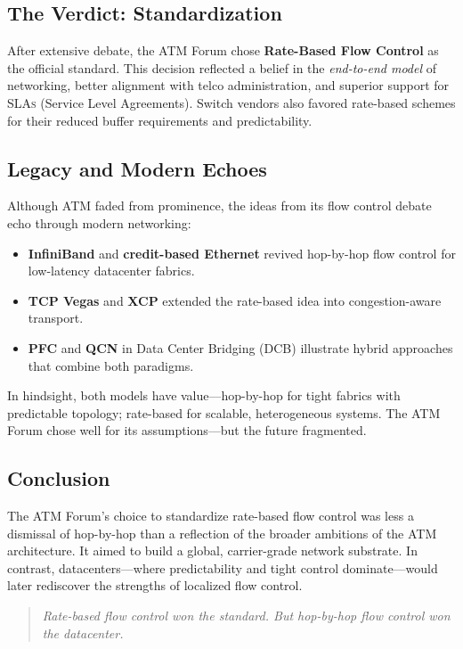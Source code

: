 \documentclass[../../../OAE-SPEC-MAIN.tex]{subfiles}
\begin{document}

\subsection{The Verdict: Standardization}

After extensive debate, the ATM Forum chose \textbf{Rate-Based Flow Control} as the official standard. This decision reflected a belief in the \textit{end-to-end model} of networking, better alignment with telco administration, and superior support for \textsc{SLAs} (Service Level Agreements). Switch vendors also favored rate-based schemes for their reduced buffer requirements and predictability.


\subsection{Legacy and Modern Echoes}

Although ATM faded from prominence, the ideas from its flow control debate echo through modern networking:

\begin{itemize}
  \item \textbf{InfiniBand} and \textbf{credit-based Ethernet} revived hop-by-hop flow control for low-latency datacenter fabrics.
  \item \textbf{TCP Vegas} and \textbf{XCP} extended the rate-based idea into congestion-aware transport.
  \item \textbf{PFC} and \textbf{QCN} in Data Center Bridging (DCB) illustrate hybrid approaches that combine both paradigms.
\end{itemize}

In hindsight, both models have value—hop-by-hop for tight fabrics with predictable topology; rate-based for scalable, heterogeneous systems. The ATM Forum chose well for its assumptions—but the future fragmented.


\subsection{Conclusion}

The ATM Forum's choice to standardize rate-based flow control was less a dismissal of hop-by-hop than a reflection of the broader ambitions of the ATM architecture. It aimed to build a global, carrier-grade network substrate. In contrast, datacenters—where predictability and tight control dominate—would later rediscover the strengths of localized flow control.

\begin{quote}
\itshape
Rate-based flow control won the standard. But hop-by-hop flow control won the datacenter.
\end{quote}
\end{document}
